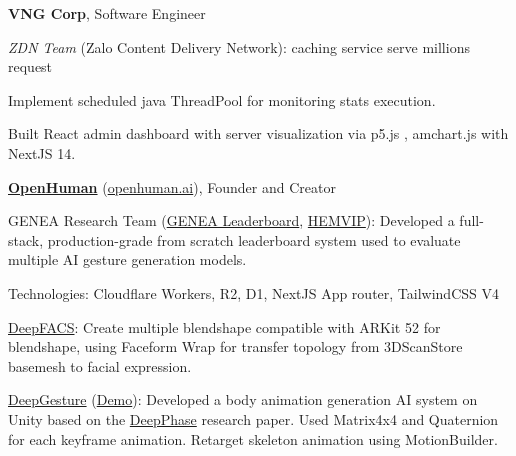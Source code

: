 \cvspace

\begin{twocolentry}{
	}
	\textbf{VNG Corp}, Software Engineer
	
	\textit{ZDN Team} (Zalo Content Delivery Network): caching service serve millions request
	\begin{highlights}
		\item Implement scheduled java ThreadPool for monitoring stats execution.
		\item Built React admin dashboard with server visualization via p5.js , amchart.js with NextJS 14.
	\end{highlights}
\end{twocolentry}

\begin{twocolentry}{
	}
	\href{https://www.linkedin.com/company/openhuman/}{\textbf{OpenHuman}} (\href{https://openhuman.ai}{openhuman.ai}), Founder and Creator
	
	\begin{highlights}
		\item GENEA Research Team (\href{https://genealeaderboard.github.io}{GENEA Leaderboard}, \href{https://github.com/hemvip/hemvip.github.io}{HEMVIP}): Developed a full-stack, production-grade from scratch leaderboard system used to evaluate multiple AI gesture generation models.
		
		Technologies:  Cloudflare Workers, R2, D1, NextJS App router, TailwindCSS V4
		
		\item  \href{https://github.com/DeepFACS}{DeepFACS}: Create multiple blendshape compatible with ARKit 52 for blendshape, using Faceform Wrap for transfer topology from 3DScanStore basemesh to facial expression.
		
		\item \href{https://github.com/DeepGesture/DeepGesture-Unity}{DeepGesture} (\href{https://www.youtube.com/watch?v=eZghfNGmZn8}{Demo}): Developed a body animation generation AI system on Unity based on the \href{https://www.youtube.com/watch?v=YhH4PYEkVnY}{DeepPhase} research paper. Used Matrix4x4 and Quaternion for each keyframe animation. Retarget skeleton animation using MotionBuilder.
	\end{highlights}
	
\end{twocolentry}
